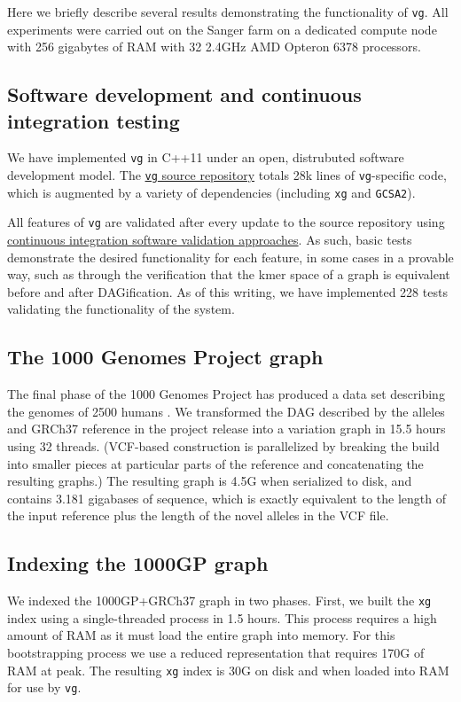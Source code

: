 \documentclass{article}
\begin{document}
Here we briefly describe several results demonstrating the functionality of {\tt vg}.
All experiments were carried out on the Sanger farm on a dedicated compute node with 256 gigabytes of RAM with 32 2.4GHz AMD Opteron 6378 processors.

\subsection{Software development and continuous integration testing}

We have implemented {\tt vg} in C++11 under an open, distrubuted software development model.
The \href{https://github.com/vgteam/vg}{{\tt vg} source repository} totals 28k lines of {\tt vg}-specific code, which is augmented by a variety of dependencies (including {\tt xg} and {\tt GCSA2}).

All features of {\tt vg} are validated after every update to the source repository using \href{https://travis-ci.org/vgteam/vg}{continuous integration software validation approaches}.
As such, basic tests demonstrate the desired functionality for each feature, in some cases in a provable way, such as through the verification that the kmer space of a graph is equivalent before and after DAGification.
As of this writing, we have implemented 228 tests validating the functionality of the system.

\subsection{The 1000 Genomes Project graph}

The final phase of the 1000 Genomes Project has produced a data set describing the genomes of 2500 humans \cite{10002015global}.
We transformed the DAG described by the alleles and GRCh37 reference in the project release into a variation graph in 15.5 hours using 32 threads.
(VCF-based construction is parallelized by breaking the build into smaller pieces at particular parts of the reference and concatenating the resulting graphs.)
The resulting graph is 4.5G when serialized to disk, and contains 3.181 gigabases of sequence, which is exactly equivalent to the length of the input reference plus the length of the novel alleles in the VCF file.

\subsection{Indexing the 1000GP graph}

We indexed the 1000GP+GRCh37 graph in two phases.
First, we built the {\tt xg} index using a single-threaded process in 1.5 hours.
This process requires a high amount of RAM as it must load the entire graph into memory. For this bootstrapping process we use a reduced representation that requires 170G of RAM at peak.
The resulting {\tt xg} index is 30G on disk and when loaded into RAM for use by {\tt vg}.
\end{document}
